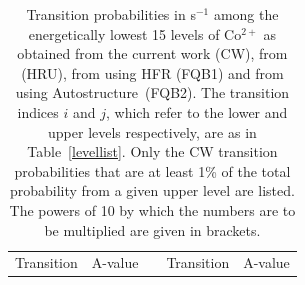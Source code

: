 \documentclass[useAMS,usenatbib]{mn2e}
\newcommand{\AS}    {{\sc Autostructure}}
\begin{document}
\onecolumn


\begin{table}
\caption{Transition probabilities in s$^{-1}$ among the energetically lowest 15 levels of Co$^{2+}$
as obtained from the current work (CW), from \citet{HansenRU1984} (HRU), from \citet{FivetQB2016}
using HFR (FQB1) and from \citet{FivetQB2016} using \AS\ (FQB2). The transition indices $i$ and
$j$, which refer to the lower and upper levels respectively, are as in Table~\ref{levellist}. Only
the CW transition probabilities that are at least 1\% of the total probability from a given upper
level are listed. The powers of 10 by which the numbers are to be multiplied are given in
brackets.}
 \centering
%
\begin{tabular}{ccccccccccccc}
\hline
\multicolumn{2}{c}{Transition} & \multicolumn{ 4}{c}{A-value} & & \multicolumn{2}{c}{Transition} & \multicolumn{ 4}{c}{A-value} \\


\end{tabular}
\end{table}
\end{document}
